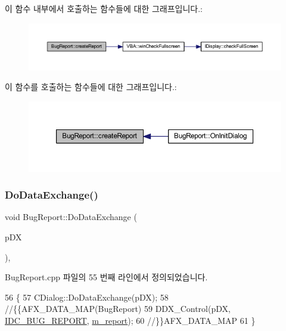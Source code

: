 이 함수 내부에서 호출하는 함수들에 대한 그래프입니다.\+:
\nopagebreak
\begin{figure}[H]
\begin{center}
\leavevmode
\includegraphics[width=350pt]{class_bug_report_afe00e8dd3efa190199d8d645cb702e07_cgraph}
\end{center}
\end{figure}
이 함수를 호출하는 함수들에 대한 그래프입니다.\+:
\nopagebreak
\begin{figure}[H]
\begin{center}
\leavevmode
\includegraphics[width=350pt]{class_bug_report_afe00e8dd3efa190199d8d645cb702e07_icgraph}
\end{center}
\end{figure}
\mbox{\label{class_bug_report_a5b019306aeca9497b7b6efd438a44558}} 
\subsubsection{\texorpdfstring{Do\+Data\+Exchange()}{DoDataExchange()}}
{\footnotesize\ttfamily void Bug\+Report\+::\+Do\+Data\+Exchange (\begin{DoxyParamCaption}\item[{C\+Data\+Exchange $\ast$}]{p\+DX }\end{DoxyParamCaption})\hspace{0.3cm}{\ttfamily [protected]}, {\ttfamily [virtual]}}



Bug\+Report.\+cpp 파일의 55 번째 라인에서 정의되었습니다.


\begin{DoxyCode}
56 \{
57   CDialog::DoDataExchange(pDX);
58   \textcolor{comment}{//\{\{AFX\_DATA\_MAP(BugReport)}
59   DDX\_Control(pDX, \mbox{\hyperlink{resource_8h_a310a95d5f9724c0a5ab90008316fe541}{IDC\_BUG\_REPORT}}, \mbox{\hyperlink{class_bug_report_aef6dd887fcfe40d98d0fa1c6cf2d2466}{m\_report}});
60   \textcolor{comment}{//\}\}AFX\_DATA\_MAP}
61 \}
\end{DoxyCode}
\mbox{\label{class_bug_report_a6b74689c7cf7ed6daeaaf2dc8f1498ab}} 
